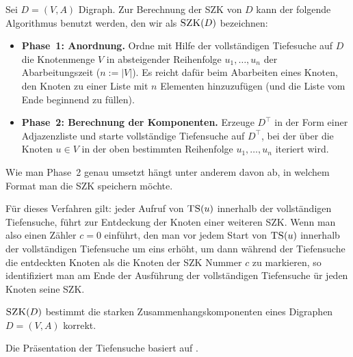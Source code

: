 \begin{bem}  \label{szk:algo}
	Sei $D = (V,A)$ Digraph. Zur Berechnung der SZK von $D$ kann der folgende Algorithmus benutzt werden, den wir als $\mathop{\text{\textsc{SZK}}}(D)$ bezeichnen: 
\begin{itemize}
	\item \textbf{Phase~1: Anordnung.} Ordne mit Hilfe der vollständigen Tiefesuche auf $D$ die Knotenmenge $V$ in absteigender Reihenfolge $u_1,\ldots,u_n$ der Abarbeitungszeit ($n:=|V|$). Es reicht dafür beim Abarbeiten eines Knoten, den Knoten zu einer Liste mit $n$ Elementen hinzuzufügen (und die Liste vom Ende beginnend zu füllen). 
	\item \textbf{Phase~2: Berechnung der Komponenten.} Erzeuge $D^\top$ in der Form einer Adjazenzliste und starte vollständige Tiefensuche auf $D^\top$, bei der  über die Knoten $u \in V$ in der oben bestimmten Reihenfolge $u_1,\ldots,u_n$ iteriert wird. 
\end{itemize} 

Wie man Phase~2 genau umsetzt hängt unter anderem davon ab, in welchem Format man die SZK speichern möchte. 

Für dieses Verfahren gilt: jeder Aufruf von $\mathop{\text{\textsc{TS}}}(u)$ innerhalb der vollständigen Tiefensuche, führt zur Entdeckung der Knoten einer weiteren SZK. Wenn man also einen Zähler $c=0$ einführt, den man vor jedem Start von $\mathop{\text{\textsc{TS}}}(u)$ innerhalb der vollständigen Tiefensuche um eins erhöht, um dann während der Tiefensuche die entdeckten Knoten als die Knoten der SZK Nummer $c$ zu markieren, so identifiziert man am Ende der Ausführung der vollständigen Tiefensuche ür jeden Knoten seine SZK. 
\end{bem} 



\begin{thm}
$\mathop{\text{\textsc{SZK}}}(D)$ bestimmt die starken Zusammenhangskomponenten eines Digraphen~$D=(V,A)$ korrekt.
\end{thm}


\begin{bem}
	Die Präsentation der Tiefensuche basiert auf  \cite{CLRS17}.
\end{bem} 